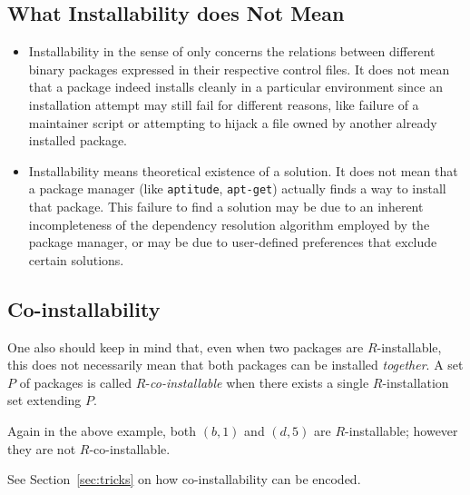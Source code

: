 \subsection{What Installability does Not Mean}

\begin{itemize}
\item Installability in the sense of \debcheck{} only concerns the
  relations between different binary packages expressed in their
  respective control files. It does not mean that a package indeed
  installs cleanly in a particular environment since an installation
  attempt may still fail for different reasons, like failure of a
  maintainer script or attempting to hijack a file owned by another
  already installed package.
\item Installability means theoretical existence of a solution. It
  does not mean that a package manager (like \texttt{aptitude},
  \texttt{apt-get}) actually finds a way to install that package.
  This failure to find a solution may be due to an inherent
  incompleteness of the dependency resolution algorithm employed by
  the package manager, or may be due to user-defined preferences that
  exclude certain solutions.
\end{itemize}

\subsection{Co-installability}
\label{sec:coinstallability}
One also should keep in mind that, even when two packages are
$R$-installable, this does not necessarily mean that both packages can
be installed \emph{together}. A set $P$ of packages is called
$R$-\emph{co-installable} when there exists a single $R$-installation
set extending $P$.

\begin{example}
  Again in the above example, both $(b,1)$ and $(d,5)$ are
  $R$-installable; however they are not $R$-co-installable.
\end{example}

See Section~\ref{sec:tricks} on how co-installability can be encoded.
